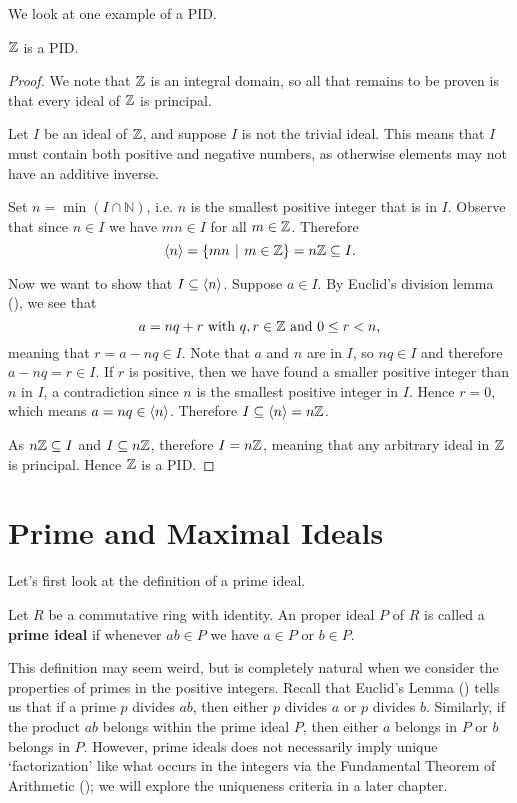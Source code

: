 We look at one example of a PID.
\begin{proposition}\label{prop-Z-is-PID}
    $\mathbb{Z}$ is a PID.
\end{proposition}
\begin{proof}
    We note that $\mathbb{Z}$ is an integral domain, so all that remains to be proven is that every ideal of $\mathbb{Z}$ is principal.

    Let $I$ be an ideal of $\mathbb{Z}$, and suppose $I$ is not the trivial ideal. This means that $I$ must contain both positive and negative numbers, as otherwise elements may not have an additive inverse.

    Set $n = \min(I \cap \mathbb{N})$, i.e. $n$ is the smallest positive integer that is in $I$. Observe that since $n \in I$ we have $mn \in I$ for all $m \in \mathbb{Z}$. Therefore
    \[
        \princ{n} = \{mn \vert m \in \Z\} = n\Z \subseteq I.
    \]

    Now we want to show that $I \subseteq \left\langle n\right\rangle$. Suppose $a \in I$. By Euclid's division lemma (), we see that
    \[
        a = nq + r \text{ with } q,r\in\mathbb{Z} \text{ and } 0 \leq r < n,
    \]
    meaning that $r = a - nq \in I$. Note that $a$ and $n$ are in $I$, so $nq \in I$ and therefore $a - nq = r \in I$. If $r$ is positive, then we have found a smaller positive integer than $n$ in $I$, a contradiction since $n$ is the smallest positive integer in $I$. Hence $r = 0$, which means $a = nq \in \left\langle n\right\rangle$. Therefore $I \subseteq \left\langle n\right\rangle = n\mathbb{Z}$.

    As $n\mathbb{Z} \subseteq I$ and $I \subseteq n\mathbb{Z}$, therefore $I = n\mathbb{Z}$, meaning that any arbitrary ideal in $\mathbb{Z}$ is principal. Hence $\mathbb{Z}$ is a PID.
\end{proof}

\section{Prime and Maximal Ideals}\label{section-prime-and-maximal-ideals}
Let's first look at the definition of a prime ideal.
\begin{definition}
    Let $R$ be a commutative ring with identity. An proper ideal $P$ of $R$ is called a \textbf{prime ideal} if whenever $ab \in P$ we have $a \in P$ or $b \in P$.
\end{definition}
This definition may seem weird, but is completely natural when we consider the properties of primes in the positive integers. Recall that Euclid's Lemma () tells us that if a prime $p$ divides $ab$, then either $p$ divides $a$ or $p$ divides $b$. Similarly, if the product $ab$ belongs within the prime ideal $P$, then either $a$ belongs in $P$ or $b$ belongs in $P$. However, prime ideals does not necessarily imply unique `factorization' like what occurs in the integers via the Fundamental Theorem of Arithmetic (); we will explore the uniqueness criteria in a later chapter.

